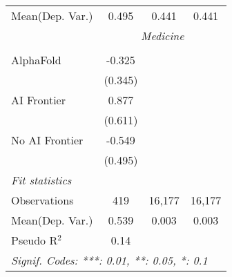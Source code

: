\begin{tabular}{lccc}
Mean(Dep. Var.) & 0.495 & 0.441 & 0.441 \\
 & \multicolumn{3}{c}{\textit{Medicine}} \\ \\
   AlphaFold      & -0.325   &        &   \\   
                  & (0.345)  &        &   \\   
   AI Frontier    & 0.877    &        &   \\   
                  & (0.611)  &        &   \\   
   No AI Frontier & -0.549   &        &   \\   
                  & (0.495)  &        &   \\   
   \midrule
   \emph{Fit statistics}\\
   Observations   & 419      & 16,177 & 16,177\\  
Mean(Dep. Var.) & 0.539 & 0.003 & 0.003 \\
   Pseudo R$^2$   & 0.14     &        & \\  
   \midrule \midrule
   \multicolumn{4}{l}{\emph{Signif. Codes: ***: 0.01, **: 0.05, *: 0.1}}\\
\end{tabular}
\par\endgroup
